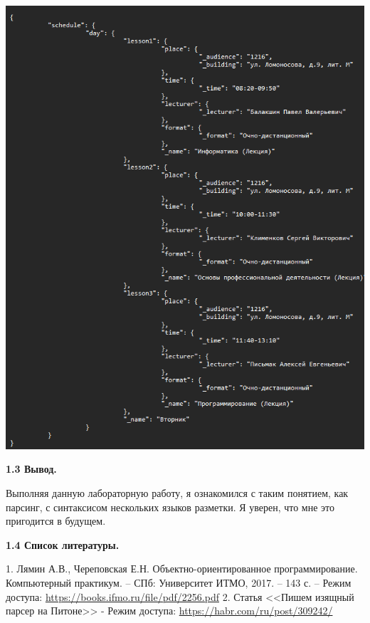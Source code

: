 	\begin{center}
		\includegraphics[scale=1]{json}
		\linebreak
	\end{center}
	\newpage
	
	\begin{flushleft}
		\textbf{\LARGE 1.3 Вывод.}
		\linebreak
		\vspace*{5mm}
		
		 Выполняя данную лабораторную работу, я ознакомился с таким понятием, как парсинг, с синтаксисом нескольких языков разметки. Я уверен, что мне это пригодится в будущем.
	\end{flushleft}
	\newpage
	
	\begin{flushleft}
		\textbf{\LARGE 1.4 Список литературы.}
		\linebreak
		\vspace*{5mm}
		
		\small 1. Лямин А.В., Череповская Е.Н. Объектно-ориентированное программирование. Компьютерный практикум. – СПб: Университет ИТМО, 2017. – 143 с. – Режим доступа:
		\href{https://books.ifmo.ru/file/pdf/2256.pdf}{https://books.ifmo.ru/file/pdf/2256.pdf}
		\linebreak
		\small 2. Статья <<Пишем изящный парсер на Питоне>> - Режим доступа:
		\href{https://habr.com/ru/post/309242/}{https://habr.com/ru/post/309242/}
	\end{flushleft}
